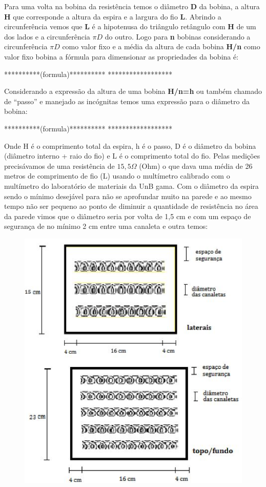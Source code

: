 Para uma volta na bobina da resistência temos o diâmetro \textbf{D} da bobina, a altura \textbf{H} que corresponde a altura da espira e a largura do fio \textbf{L}. Abrindo a circunferência vemos que \textbf{L} é a hipotenusa do triângulo retângulo com \textbf{H} de um dos lados e a circunferência \textbf{$\pi D$} do outro.
Logo para \textbf{n} bobinas considerando a circunferência \textbf{$\pi D$} como valor fixo e a média da altura de cada bobina \textbf{H/n} como valor fixo bobina  a fórmula para dimensionar as propriedades da bobina é:

**********(formula)**********
******************

Considerando a expressão da altura de uma bobina \textbf{H/n=h} ou também chamado de “passo” e manejado as incógnitas temos uma expressão para o diâmetro da bobina:

**********(formula)**********
******************

Onde H é o comprimento total da espira, h é o passo, D é o diâmetro da bobina (diâmetro interno + raio do fio) e L é o comprimento total do fio.
Pelas medições precisávamos de uma resistência de $15,5\Omega$ (Ohm) o que dava uma média de 26 metros de comprimento de fio (L) usando o multímetro calibrado com o multímetro do laboratório de materiais da UnB gama.
Com o diâmetro da espira sendo o mínimo desejável para não se aprofundar muito na parede e ao mesmo tempo não ser pequeno ao ponto de diminuir a quantidade de resistência no área da parede vimos que o diâmetro seria por volta de 1,5 cm e com um espaço de segurança de no mínimo 2 cm entre uma canaleta e outra temos:

\begin{figure}[H]
	\centering
	\label{resistencia2}
	\includegraphics[keepaspectratio=true,scale=1.0]{figuras/alimentacao4.JPG}
\end{figure}


